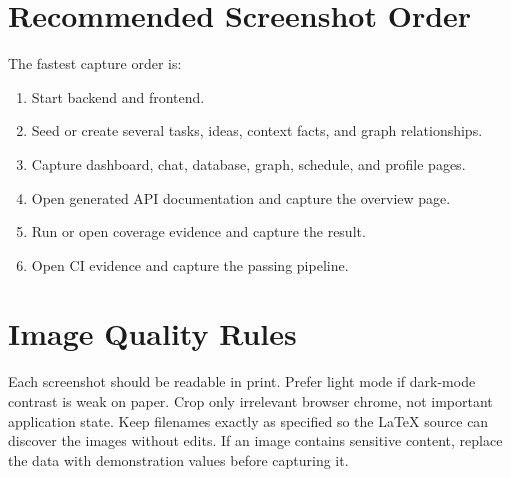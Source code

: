 \section{Recommended Screenshot Order}

The fastest capture order is:

\begin{enumerate}
  \item Start backend and frontend.
  \item Seed or create several tasks, ideas, context facts, and graph relationships.
  \item Capture dashboard, chat, database, graph, schedule, and profile pages.
  \item Open generated API documentation and capture the overview page.
  \item Run or open coverage evidence and capture the result.
  \item Open CI evidence and capture the passing pipeline.
\end{enumerate}

\section{Image Quality Rules}

Each screenshot should be readable in print. Prefer light mode if dark-mode contrast is weak on paper. Crop only irrelevant browser chrome, not important application state. Keep filenames exactly as specified so the LaTeX source can discover the images without edits. If an image contains sensitive content, replace the data with demonstration values before capturing it.
